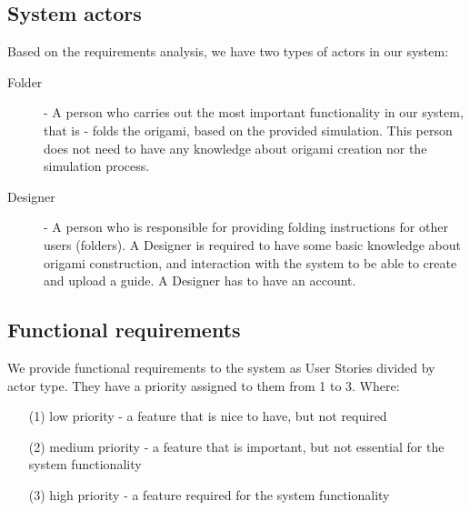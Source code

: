 \subsection{System actors}

Based on the requirements analysis, we have  two types of actors in our system:

\begin{description}
	\item[Folder] \label{actors:folder} - A person who carries out the most important functionality in our system,
		that is - folds the origami, based on the provided simulation. This person does not need to have any
		knowledge about origami creation nor the simulation process.
	\item[Designer] \label{actors:designer} - A person who is responsible for providing folding instructions
		for other users (folders). A Designer is required to have some basic knowledge about origami construction, 
		and interaction with the system to be able to create and upload a guide. A Designer has to have an account.
\end{description}

\newcommand{\requirement}[2]{\item #2. (#1)}
\subsection{Functional requirements}

We provide functional requirements to the system as User Stories divided by actor type.
They have a priority assigned to them from 1 to 3. Where:

\begin{enumerate}
	\item[(1)] low priority - a feature that is nice to have, but not required 
	\item[(2)] medium priority - a feature that is important, but not essential for the system functionality
	\item[(3)] high priority - a feature required for the system functionality 
\end{enumerate}

